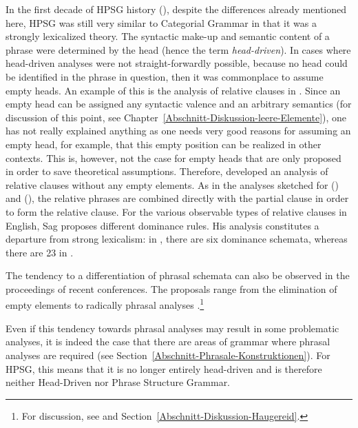In the first decade of HPSG history (\citealp*{ps,ps2,NNP94a-ed}), despite the differences already mentioned here, HPSG was still very similar to Categorial Grammar
in that it was a strongly lexicalized theory. The syntactic make-up and semantic content of a phrase were determined by the head (hence the term \emph{head-driven}).
In cases where head-driven analyses were not straight-forwardly possible, because no head could be identified in the phrase in question, then it was commonplace to
assume empty heads. An example of this is the analysis of relative clauses in \citet[Chapter~5]{ps2}.
Since an empty head can be assigned any syntactic valence and an arbitrary semantics (for discussion
of this point, see Chapter~\ref{Abschnitt-Diskussion-leere-Elemente}), one has not really explained
anything as one needs very good reasons for assuming an empty head, for example, that this empty
position can be realized in other contexts. This is, however, not the case for empty heads that are only proposed in order to save theoretical assumptions. Therefore, \citet{Sag97a} developed
an analysis of relative clauses without any empty elements. As in the analyses sketched for () and (), the relative phrases are combined directly
with the partial clause in order to form the relative clause. For the various observable types of relative clauses in English, Sag proposes different dominance rules.
His analysis constitutes a departure from strong lexicalism: in , there are six dominance schemata, whereas there are 23 in . 

The tendency to a differentiation of phrasal schemata can also be observed in the proceedings of
recent conferences. The proposals range from the elimination of empty elements to radically phrasal analyses \citep{Haugereid2007a,Haugereid2009a}.\footnote{%
	For discussion, see   and Section~\ref{Abschnitt-Diskussion-Haugereid}.
}

Even if this tendency towards phrasal analyses may result in some problematic analyses, it is indeed the case that there are areas of grammar where
phrasal analyses are required (see Section~\ref{Abschnitt-Phrasale-Konstruktionen}). For HPSG, this
means that it is no longer entirely head-driven and is therefore neither Head-Driven nor Phrase Structure Grammar.

